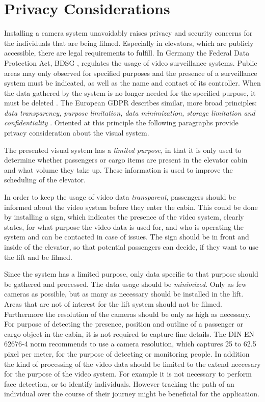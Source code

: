\section{Privacy Considerations}
Installing a camera system unavoidably raises privacy and security concerns 
for the individuals that are being filmed.
Especially in elevators, which are publicly accessible, there are legal requirements to fulfill.
In Germany the Federal Data Protection Act, \ac{BDSG} \autocite[][]{bmjv2009bdsg}, 
regulates the usage of video surveillance systems.
Public areas may only observed for specified purposes and the presence of a surveillance system must be indicated,
as well as the name and contact of its controller. 
When the data gathered by the system is no longer needed for the specified purpose, it must be deleted 
\autocite[][§~4]{bmjv2009bdsg}.
The European \ac{GDPR} \autocite{eu2016gdpr} describes similar, more broad principles:  
\emph{data transparency, purpose limitation, data minimization, storage limitation and confidentiality}
\autocite{ico2018gdpr}.
Oriented at this principle the following paragraphs provide privacy consideration about the visual system.

The presented visual system has a \emph{limited purpose}, in that it is only used 
to determine whether passengers or cargo items are present in the elevator cabin 
and what volume they take up. 
These information is used to improve the scheduling of the elevator.

In order to keep the usage of video data \emph{transparent},
passengers should be informed about the video system before they enter the cabin.
This could be done by installing a sign, which indicates the presence of the video system, 
clearly states, for what purpose the video data is used for, 
and who is operating the system and can be contacted in case of issues.
The sign should be in front and inside of the elevator, 
so that potential passengers can decide,
if they want to use the lift and be filmed.

Since the system has a limited purpose, 
only data specific to that purpose should be gathered and processed.
The data usage should be \emph{minimized}.
Only as few cameras as possible, but as many as necessary should be installed in the lift.
Areas that are not of interest for the lift system should not be filmed.
Furthermore the resolution of the cameras should be only as high as necessary.
For purpose of detecting the presence, position and outline of a passenger or cargo object 
in the cabin, it is not required to capture fine details.
The DIN EN 62676-4 norm \autocite[][]{din2016surveillance} recommends 
to use a camera resolution, which captures 25 to 62.5 pixel per meter,
for the purpose of detecting or monitoring people.
In addition the kind of processing of the video data should be limited to the extend neccesary for the purpose of the video system. 
For example it is not necessary to perform face detection, or to identify individuals.
However tracking the path of an individual over the course of their journey might be beneficial for the application.

